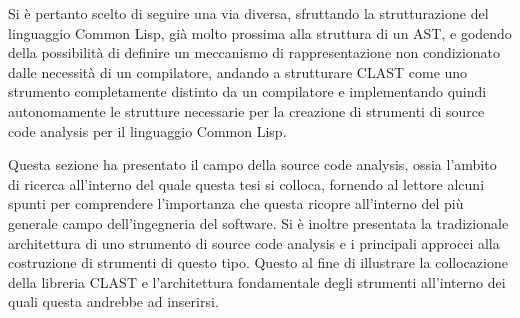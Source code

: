 Si è pertanto scelto di seguire una via diversa, sfruttando la strutturazione
del linguaggio Common Lisp, già molto prossima alla struttura di un AST, e
godendo della possibilità di definire un meccanismo di rappresentazione non
condizionato dalle necessità di un compilatore, andando a strutturare CLAST come
uno strumento completamente distinto da un compilatore e implementando quindi
autonomamente le strutture necessarie per la creazione di strumenti di source
code analysis per il linguaggio Common Lisp.

Questa sezione ha presentato il campo della source code analysis, ossia l'ambito
di ricerca all'interno del quale questa tesi si colloca, fornendo al lettore
alcuni spunti per comprendere l'importanza che questa ricopre all'interno del
più generale campo dell'ingegneria del software. Si è inoltre presentata la
tradizionale architettura di uno strumento di source code analysis e i
principali approcci alla costruzione di strumenti di questo tipo. Questo al fine
di illustrare la collocazione della libreria CLAST e l'architettura fondamentale degli strumenti all'interno dei quali questa andrebbe ad inserirsi.
